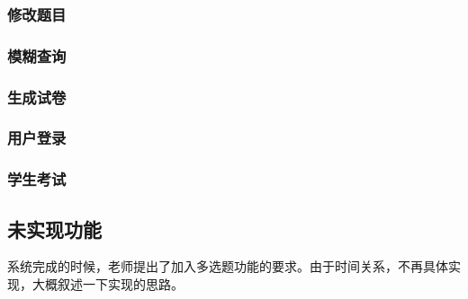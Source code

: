 \subsubsection{修改题目}
\subsubsection{模糊查询}
\subsubsection{生成试卷}
\subsubsection{用户登录}
\subsubsection{学生考试}


\subsection{未实现功能}

系统完成的时候，老师提出了加入多选题功能的要求。由于时间关系，不再具体实现，大概叙述一下实现的思路。






















